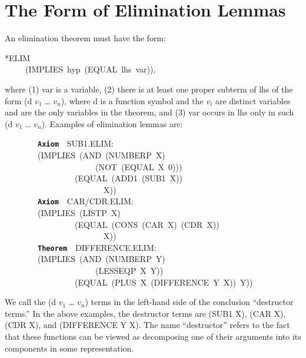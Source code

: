 \documentclass[11pt]{book}
\newenvironment{pubasis}{\begin{flushleft}\ttfamily\small}{\normalsize\rmfamily\end{flushleft}}
\newcommand{\axiomordefinition}[1]{\vspace{6pt}\texttt{\textbf{#1}}}
\newcommand{\pubdefaulttextsize}{\large}
\begin{document}
\section{The Form of Elimination Lemmas}
\pubdefaulttextsize
An elimination theorem must have the form:
\begin{pubasis}
*ELIM\\
~~~~~(IMPLIES~hyp~(EQUAL~lhs~var)),\\
\end{pubasis}
where (1) var is a variable, (2) there is at least one proper subterm of lhs
of the form (d $v_{1}$ \ldots{} $v_{n}$), where d is a function symbol
and  the $v_{i}$ are distinct
variables and are the only variables in the theorem,
and (3) var occurs in lhs only in such (d $v_{1}$ \ldots{} $v_{n}$).
Examples of elimination lemmas are:
\begin{pubasis}
~~~~~~~~\axiomordefinition{Axiom}~~SUB1.ELIM:\\
~~~~~~~~(IMPLIES~(AND~(NUMBERP~X)\\
~~~~~~~~~~~~~~~~~~~~~~(NOT~(EQUAL~X~0)))\\
~~~~~~~~~~~~~~~~~(EQUAL~(ADD1~(SUB1~X))\\
~~~~~~~~~~~~~~~~~~~~~~~~X))\\

~~~~~~~~\axiomordefinition{Axiom}~~CAR/CDR.ELIM:\\
~~~~~~~~(IMPLIES~(LISTP~X)\\
~~~~~~~~~~~~~~~~~(EQUAL~(CONS~(CAR~X)~(CDR~X))\\
~~~~~~~~~~~~~~~~~~~~~~~~X))\\

~~~~~~~~\axiomordefinition{Theorem}~~DIF\-FER\-ENCE.ELIM:\\
~~~~~~~~(IMPLIES~(AND~(NUMBERP~Y)\\
~~~~~~~~~~~~~~~~~~~~~~(LESSEQP~X~Y))\\
~~~~~~~~~~~~~~~~~(EQUAL~(PLUS~X~(DIFFERENCE~Y~X))~Y))\\
\end{pubasis}
We call the (d $v_{1}$ \ldots{} $v_{n}$) terms in the left-hand side of the
conclusion ``destructor terms.''  In the above examples, the destructor
terms are (SUB1 X), (CAR X), (CDR X), and (DIFFERENCE Y X).
The name ``destructor'' refers to the fact that these functions can be
viewed as decomposing one of their arguments into its components in some
representation.
\end{document}
